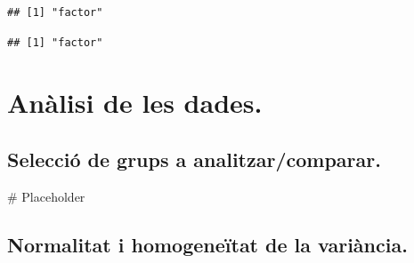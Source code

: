\documentclass[
]{article}
\newenvironment{Shaded}{\begin{snugshade}}{\end{snugshade}}
\newcommand{\CommentTok}[1]{\textcolor[rgb]{0.50,0.62,0.50}{#1}}
\newcommand{\FunctionTok}[1]{\textcolor[rgb]{0.94,0.94,0.56}{#1}}
\newcommand{\NormalTok}[1]{\textcolor[rgb]{0.80,0.80,0.80}{#1}}
\newcommand{\OtherTok}[1]{\textcolor[rgb]{0.94,0.94,0.56}{#1}}
\newcommand{\SpecialCharTok}[1]{\textcolor[rgb]{0.86,0.64,0.64}{#1}}
\begin{document}
\begin{Shaded}
\end{Shaded}

\begin{verbatim}
## [1] "factor"
\end{verbatim}

\begin{Shaded}
\end{Shaded}

\begin{verbatim}
## [1] "factor"
\end{verbatim}

\hypertarget{anuxe0lisi-de-les-dades.}{%
\section{Anàlisi de les dades.}\label{anuxe0lisi-de-les-dades.}}

\hypertarget{selecciuxf3-de-grups-a-analitzarcomparar.}{%
\subsection{Selecció de grups a
analitzar/comparar.}\label{selecciuxf3-de-grups-a-analitzarcomparar.}}

\begin{Shaded}
\begin{Highlighting}[]
\CommentTok{\# Placeholder}
\end{Highlighting}
\end{Shaded}

\hypertarget{normalitat-i-homogeneuxeftat-de-la-variuxe0ncia.}{%
\subsection{Normalitat i homogeneïtat de la
variància.}\label{normalitat-i-homogeneuxeftat-de-la-variuxe0ncia.}}
\end{document}
